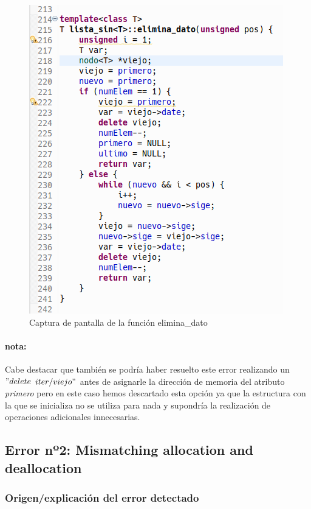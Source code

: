 			\begin{figure}[H]
				\centering
				\includegraphics[scale=0.7]{img/captura47.png}
				\caption{Captura de pantalla de la función elimina\_dato}
				\label{captura47}
			\end{figure}
		
			\paragraph{nota:}Cabe destacar que también se podría haber resuelto este error realizando un $"delete$ $iter/viejo"$ antes de asignarle la dirección de memoria del atributo \textit{primero} pero en este caso hemos descartado esta opción ya que la estructura con la que se inicializa no se utiliza para nada y supondría la realización de operaciones adicionales innecesarias.
	
	\subsection{Error nº2: Mismatching allocation and deallocation}

		\subsubsection{Origen/explicación del error detectado}
		
